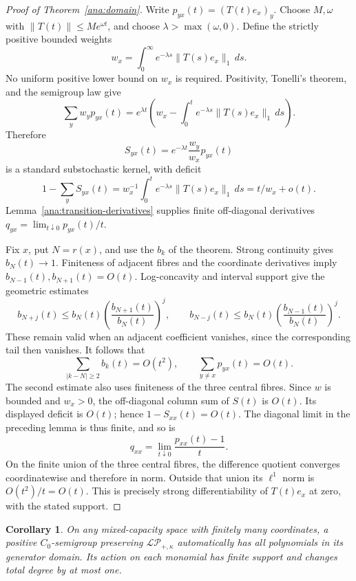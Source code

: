 \documentclass[reqno]{amsart}
\newtheorem{corollary}[theorem]{Corollary}
\theoremstyle{definition}
\theoremstyle{remark}
\begin{document}
\begin{proof}[Proof of Theorem~\ref{ana:domain}]
Write \(p_{yx}(t)=(T(t)e_x)_y\).  Choose \(M,\omega\) with
\(\|T(t)\|\le Me^{\omega t}\), and choose
\(\lambda>\max(\omega,0)\).  Define the strictly positive bounded weights
\[
 w_x=\int_0^\infty e^{-\lambda s}\|T(s)e_x\|_1\,ds .
\]
No uniform positive lower bound on \(w_x\) is required.  Positivity,
Tonelli's theorem, and the semigroup law give
\[
 \sum_yw_yp_{yx}(t)
 =e^{\lambda t}
 \left(w_x-\int_0^t e^{-\lambda s}\|T(s)e_x\|_1\,ds\right).
\]
Therefore
\[
 S_{yx}(t)=e^{-\lambda t}\frac{w_y}{w_x}p_{yx}(t)
\]
is a standard substochastic kernel, with deficit
\[
 1-\sum_yS_{yx}(t)
 =w_x^{-1}\int_0^t e^{-\lambda s}\|T(s)e_x\|_1\,ds
 =t/w_x+o(t).
\]
Lemma~\ref{ana:transition-derivatives} supplies finite off-diagonal
derivatives \(q_{yx}=\lim_{t\downarrow0}p_{yx}(t)/t\).

Fix \(x\), put \(N=r(x)\), and use the \(b_k\) of the theorem.
Strong continuity gives \(b_N(t)\to1\).  Finiteness of adjacent fibres and
the coordinate derivatives imply \(b_{N-1}(t),b_{N+1}(t)=O(t)\).
Log-concavity and interval support give the geometric estimates
\[
 b_{N+j}(t)\le b_N(t)
 \left(\frac{b_{N+1}(t)}{b_N(t)}\right)^j,\qquad
 b_{N-j}(t)\le b_N(t)
 \left(\frac{b_{N-1}(t)}{b_N(t)}\right)^j .
\]
These remain valid when an adjacent coefficient vanishes, since the
corresponding tail then vanishes.  It follows that
\[
 \sum_{|k-N|\ge2}b_k(t)=O(t^2),\qquad
 \sum_{y\ne x}p_{yx}(t)=O(t).
\]
The second estimate also uses finiteness of the three central fibres.
Since \(w\) is bounded and \(w_x>0\), the off-diagonal column sum of \(S(t)\)
is \(O(t)\).  Its displayed deficit is \(O(t)\); hence
\(1-S_{xx}(t)=O(t)\).  The diagonal limit in the preceding lemma is thus
finite, and so is
\[
 q_{xx}=\lim_{t\downarrow0}\frac{p_{xx}(t)-1}{t}.
\]
On the finite union of the three central fibres, the difference quotient
converges coordinatewise and therefore in norm.  Outside that union its
\(\ell^1\) norm is \(O(t^2)/t=O(t)\).  This is precisely strong
differentiability of \(T(t)e_x\) at zero, with the stated support.
\end{proof}

\begin{corollary}\label{ana:polynomial-domain}
On any mixed-capacity space with finitely many coordinates, a positive
\(C_0\)-semigroup preserving \(\mathcal{LP}_{+,\kappa}\) automatically has all
polynomials in its generator domain.  Its action on each monomial has finite
support and changes total degree by at most one.
\end{corollary}
\end{document}
